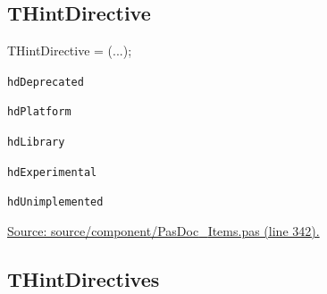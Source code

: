 \documentclass{report}
\newif\ifpdf
\begin{document}
\subsection*{THintDirective}
\fi
\label{PasDoc_Items-THintDirective}
\begin{list}{}{
\setlength{\itemindent}{0cm}
\setlength{\listparindent}{0cm}
\setlength{\leftmargin}{\evensidemargin}
\addtolength{\leftmargin}{\tmplength}
\settowidth{\labelsep}{X}
\addtolength{\leftmargin}{\labelsep}
\setlength{\labelwidth}{\tmplength}
}
\item[\textbf{Declaration}\hfill]
\ifpdf
\begin{flushleft}
\fi
\begin{ttfamily}
THintDirective = (...);\end{ttfamily}

\ifpdf
\end{flushleft}
\fi

\par
\item[\textbf{Description}]
 \item[\textbf{Values}]
\begin{description}
\item[\texttt{hdDeprecated}] \label{PasDoc_Items-hdDeprecated}
\index{}
 
\item[\texttt{hdPlatform}] \label{PasDoc_Items-hdPlatform}
\index{}
 
\item[\texttt{hdLibrary}] \label{PasDoc_Items-hdLibrary}
\index{}
 
\item[\texttt{hdExperimental}] \label{PasDoc_Items-hdExperimental}
\index{}
 
\item[\texttt{hdUnimplemented}] \label{PasDoc_Items-hdUnimplemented}
\index{}
 
\end{description}
\par
\href{https://github.com/pasdoc/pasdoc/blob/master/source/component/PasDoc_Items.pas#L342}{Source: source/component/PasDoc{\_}Items.pas (line 342).}

\end{list}
\ifpdf
\subsection*{\large{\textbf{THintDirectives}}\normalsize\hspace{1ex}\hrulefill}
\else
\end{document}
